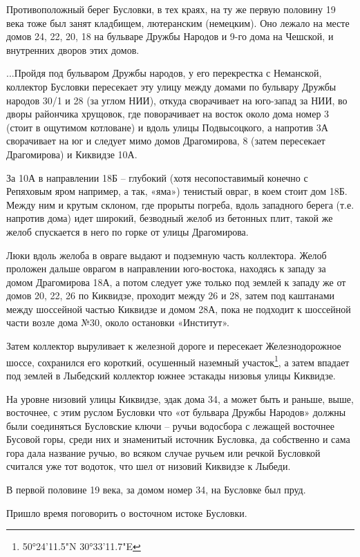 Противоположный берег Бусловки, в тех краях, на ту же первую половину 19 века тоже был занят кладбищем, лютеранским (немецким). Оно лежало на месте домов 24, 22, 20, 18 на бульваре Дружбы Народов и 9-го дома на Чешской, и внутренних дворов этих домов.

...Пройдя под бульваром Дружбы народов, у его перекрестка с Неманской, коллектор Бусловки пересекает эту улицу между домами по бульвару Дружбы народов 30/1 и 28 (за углом НИИ), откуда сворачивает на юго-запад за НИИ, во дворы райончика хрущовок, где поворачивает на восток около дома номер 3 (стоит в ощутимом котловане) и вдоль улицы Подвысоцкого, а напротив 3А сворачивает на юг и следует мимо домов Драгомирова, 8 (затем пересекает Драгомирова) и Киквидзе 10А.

За 10А в направлении 18Б – глубокий (хотя несопоставимый конечно с Репяховым яром например, а так, «яма») тенистый овраг, в коем стоит дом 18Б. Между ним и крутым склоном, где прорыты погреба, вдоль западного берега (т.е. напротив дома) идет широкий, безводный желоб из бетонных плит, такой же желоб спускается в него по горке от улицы Драгомирова.  

Люки вдоль желоба в овраге выдают и подземную часть коллектора. Желоб проложен дальше оврагом в направлении юго-востока, находясь к западу за домом Драгомирова 18А, а потом следует уже только под землей к западу же от домов 20, 22, 26 по Киквидзе, проходит между 26 и 28, затем под каштанами между шоссейной частью Киквидзе и домом 28А, пока не подходит к шоссейной части возле дома №30, около остановки «Институт».

Затем коллектор выруливает к железной дороге и пересекает Железнодорожное шоссе, сохранился его короткий, осушенный наземный участок\footnote{50°24'11.5"N 30°33'11.7"E}, а затем впадает под землей в Лыбедский коллектор южнее эстакады низовья улицы Киквидзе.

На уровне низовий улицы Киквидзе, эдак дома 34, а может быть и раньше, выше, восточнее, с этим руслом Бусловки что «от бульвара Дружбы Народов» должны были соединяться Бусловские ключи – ручьи водосбора с лежащей восточнее Бусовой горы, среди них и знаменитый источник Бусловка, да собственно и сама гора дала название ручью, во всяком случае ручьем или речкой Бусловкой считался уже тот водоток, что шел от низовий Киквидзе к Лыбеди.

В первой половине 19 века, за домом номер 34, на Бусловке был пруд.

Пришло время поговорить о восточном истоке Бусловки.


